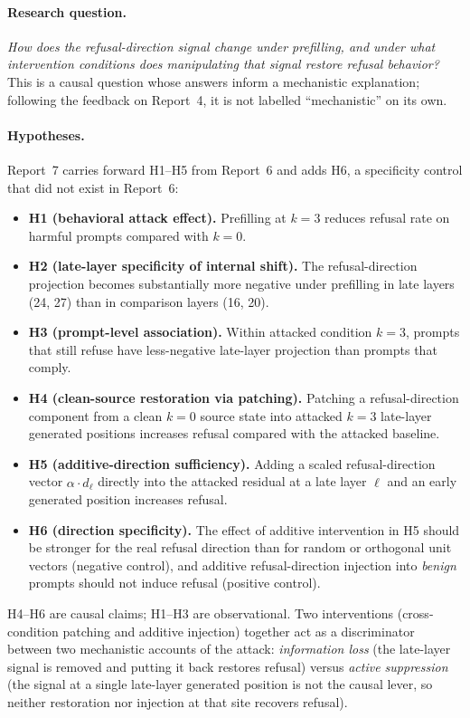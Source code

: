 \documentclass{article}
\begin{document}
\paragraph{Research question.}
\emph{How does the refusal-direction signal change under prefilling, and
under what intervention conditions does manipulating that signal restore
refusal behavior?} This is a causal question whose answers inform a
mechanistic explanation; following the feedback on Report~4, it is not
labelled ``mechanistic'' on its own.

\paragraph{Hypotheses.}
Report~7 carries forward H1--H5 from Report~6 and adds H6, a specificity
control that did not exist in Report~6:

\begin{itemize}
\item \textbf{H1 (behavioral attack effect).} Prefilling at $k=3$ reduces
  refusal rate on harmful prompts compared with $k=0$.
\item \textbf{H2 (late-layer specificity of internal shift).} The
  refusal-direction projection becomes substantially more negative under
  prefilling in late layers (24, 27) than in comparison layers (16, 20).
\item \textbf{H3 (prompt-level association).} Within attacked condition
  $k=3$, prompts that still refuse have less-negative late-layer projection
  than prompts that comply.
\item \textbf{H4 (clean-source restoration via patching).} Patching a
  refusal-direction component from a clean $k=0$ source state into attacked
  $k=3$ late-layer generated positions increases refusal compared with the
  attacked baseline.
\item \textbf{H5 (additive-direction sufficiency).} Adding a scaled
  refusal-direction vector $\alpha\cdot\hat{d}_\ell$ directly into the
  attacked residual at a late layer $\ell$ and an early generated position
  increases refusal.
\item \textbf{H6 (direction specificity).} The effect of additive
  intervention in H5 should be stronger for the real refusal direction than
  for random or orthogonal unit vectors (negative control), and additive
  refusal-direction injection into \emph{benign} prompts should not induce
  refusal (positive control).
\end{itemize}

H4--H6 are causal claims; H1--H3 are observational. Two interventions
(cross-condition patching and additive injection) together act as a
discriminator between two mechanistic accounts of the attack:
\emph{information loss} (the late-layer signal is removed and putting it
back restores refusal) versus \emph{active suppression} (the signal at a
single late-layer generated position is not the causal lever, so neither
restoration nor injection at that site recovers refusal).
\end{document}
